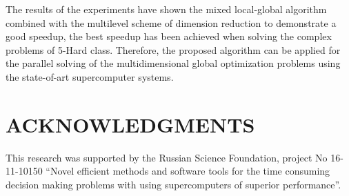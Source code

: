 \documentclass{aip-cp}
\begin{document}
The results of the experiments have shown the mixed local-global algorithm combined with the multilevel scheme of dimension reduction to demonstrate a good speedup, the best speedup has been achieved when solving the complex problems of 5-Hard class. Therefore, the proposed algorithm can be applied for the parallel solving of the multidimensional global optimization problems using the state-of-art supercomputer systems.

\section{ACKNOWLEDGMENTS}
This research was supported by the Russian Science Foundation, project No 16-11-10150 “Novel efficient methods and software tools for the time consuming decision making problems with using supercomputers of superior performance”.


\nocite{*}
%
%
\end{document}
